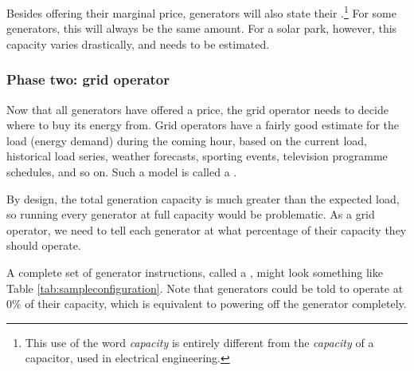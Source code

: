 \documentclass[main.tex]{subfiles}
\begin{document}

Besides offering their marginal price, generators will also state their .\footnote{This use of the word \emph{capacity} is entirely different from the \emph{capacity} of a capacitor, used in electrical engineering.} For some generators, this will always be the same amount. For a solar park, however, this capacity varies drastically, and needs to be estimated.

\subsubsection*{Phase two: grid operator}
Now that all generators have offered a price, the grid operator needs to decide where to buy its energy from. Grid operators have a fairly good estimate for the load (energy demand) during the coming hour, based on the current load, historical load series, weather forecasts, sporting events, television programme schedules, and so on. Such a model is called a . 

By design, the total generation capacity is much greater than the expected load,  so running every generator at full capacity would be problematic.
As a grid operator, we need to tell each generator at what percentage of their capacity they should operate. 

A complete set of generator instructions, called a , might look something like Table \ref{tab:sampleconfiguration}. Note that generators could be told to operate at 0\% of their capacity, which is equivalent to powering off the generator completely.
\end{document}
